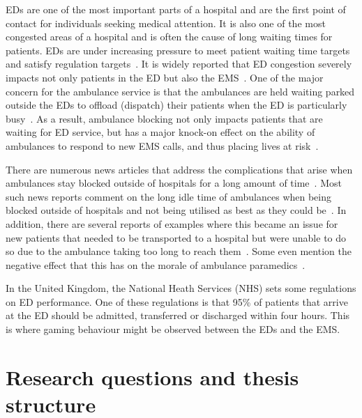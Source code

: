 EDs are one of the most important parts of a hospital and are the first point
of contact for individuals seeking medical attention.
It is also one of the most congested areas of a hospital and is often the
cause of long waiting times for patients.
EDs are under increasing pressure to meet patient waiting time targets and
satisfy regulation targets~\cite{EmergencyDepartmentWinterPressures}.
It is widely reported that ED congestion severely impacts not only patients in
the ED but also the EMS~\cite{mirror, bmj, thenews}.
One of the major concern for the ambulance service is that the ambulances are
held waiting parked outside the EDs to offload (dispatch) their patients when
the ED is particularly busy~\cite{clarey2014ambulance}.
As a result, ambulance blocking not only impacts patients that are waiting for
ED service, but has a major knock-on effect on the ability of ambulances to
respond to new EMS calls, and thus placing lives at risk~\cite{eastanglia}.

There are numerous news articles that address the complications that arise when
ambulances stay blocked outside of hospitals for a long amount of
time~\cite{dailyrecords, staffordshirelive}.
Most such news reports comment on the long idle time of ambulances when
being blocked outside of hospitals and not being utilised as best as they
could be~\cite{herefordtimes}.
In addition, there are several reports of examples where this became an issue
for new patients that needed to be transported to a hospital but were unable
to do so due to the ambulance taking too long to reach
them~\cite{southwalesargus}.
Some even mention the negative effect that this has on the morale of ambulance
paramedics~\cite{bbcwales}.

In the United Kingdom, the National Heath Services (NHS) sets some regulations
on ED performance.
One of these regulations is that 95\% of patients that arrive at the ED should
be admitted, transferred or discharged within four hours.
This is where gaming behaviour might be observed between the EDs and the EMS.



\section{Research questions and thesis structure}\label{sec:intro_research}


